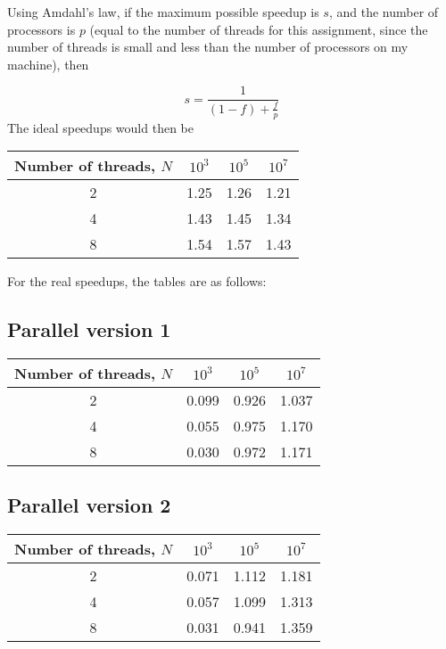\documentclass[a4paper]{article}
\begin{document}
Using Amdahl's law, if the maximum possible speedup is $s$, and the number of processors is $p$ (equal to the number of threads for this assignment, since the number of threads is small and less than the number of
processors on my machine), then

\[
    s = \frac{1}{\left(1 - f\right) + \frac{f}{p}}
\]
The ideal speedups would then be
\begin{center}
    \begin{tabular}{|c|c|c|c|}
        \hline
        Number of threads, $N$ & $10^3$ & $10^5$ & $10^7$ \\
        \hline
        2 & 1.25 & 1.26 & 1.21 \\
        \hline
        4 & 1.43 & 1.45 & 1.34 \\
        \hline
        8 & 1.54 & 1.57 & 1.43 \\
        \hline
    \end{tabular}
\end{center}

For the real speedups, the tables are as follows:

\subsection{Parallel version 1}

\begin{center}
    \begin{tabular}{|c|c|c|c|}
        \hline
        Number of threads, $N$ & $10^3$ & $10^5$ & $10^7$ \\
        \hline
        2 & 0.099 & 0.926 & 1.037 \\
        \hline
        4 & 0.055 & 0.975 & 1.170 \\
        \hline
        8 & 0.030 & 0.972 & 1.171 \\
        \hline
    \end{tabular}
\end{center}

\subsection{Parallel version 2}

\begin{center}
    \begin{tabular}{|c|c|c|c|}
        \hline
        Number of threads, $N$ & $10^3$ & $10^5$ & $10^7$ \\
        \hline
        2 & 0.071 & 1.112 & 1.181 \\
        \hline
        4 & 0.057 & 1.099 & 1.313 \\
        \hline
        8 & 0.031 & 0.941 & 1.359 \\
        \hline
    \end{tabular}
\end{center}
\end{document}
